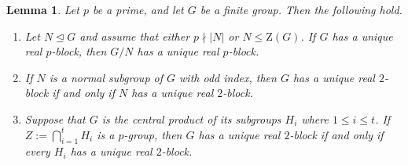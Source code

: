 \documentclass[10pt]{article}
\newtheorem{lem}{\bf Lemma}[section]
\begin{document}
\begin{lem}\label{lem: basic}
	Let $p$ be a prime, and let $G$ be a finite group.
  Then the following hold.
  \begin{enumerate}[\rm (1)]
       \item Let $N\unlhd G$ and assume that either $p\nmid |N|$ or $N\leq \mathrm{Z}(G)$. 
       If $G$ has a unique real $p$-block, then $G/N$ has a unique real $p$-block.
		\item  If $N$ is a normal subgroup of $G$ with odd index,
    then
    $G$ has a unique real $2$-block if and only if $N$ has a unique real $2$-block.
    \item  Suppose that $G$ is the central product of its subgroups $H_i$ where $1 \leq i\leq t$.
    If $Z:=\bigcap_{i=1}^{t}H_i$ is a $p$-group,
    then $G$ has a unique real $2$-block if and only if every $H_i$ has a unique real $2$-block.
  \end{enumerate}
\end{lem}
\end{document}
